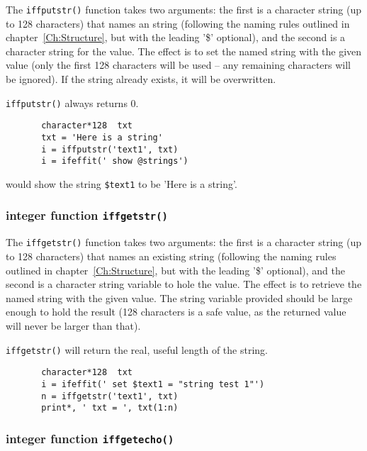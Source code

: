 {}
The {\tt{iffputstr()}} function takes two arguments: the first is a
character string (up to 128 characters) that names an {\ifeffit} string
(following the naming rules outlined in chapter~\ref{Ch:Structure}, but
with the leading '\$' optional), and the second is a character string for
the value.  The effect is to set the named string with the given value
(only the first 128 characters will be used -- any remaining characters
will be ignored).  If the string already exists, it will be overwritten.

{\tt{iffputstr()}} always returns 0.

\begin{verbatim}
       character*128  txt
       txt = 'Here is a string'
       i = iffputstr('text1', txt)
       i = ifeffit(' show @strings')
\end{verbatim}
\noindent
would show the string {\tt{\$text1}} to be 'Here is a string'.


\subsubsection{integer function {\tt{iffgetstr()}}}\label{Ch:Script-f77:getstr}

{}
The {\tt{iffgetstr()}} function takes two arguments: the first is a
character string (up to 128 characters) that names an existing {\ifeffit}
string (following the naming rules outlined in chapter~\ref{Ch:Structure},
but with the leading '\$' optional), and the second is a character string
variable to hole the value.  The effect is to retrieve the named string
with the given value.  The string variable provided should be large enough
to hold the result (128 characters is a safe value, as the returned value
will never be larger than that).

{\tt{iffgetstr()}} will return the real, useful length of the string.

\begin{verbatim}
       character*128  txt
       i = ifeffit(' set $text1 = "string test 1"')
       n = iffgetstr('text1', txt)
       print*, ' txt = ', txt(1:n)
\end{verbatim} %
\noindent

\subsubsection{integer function {\tt{iffgetecho()}}}\label{Ch:Script-f77:getecho}

